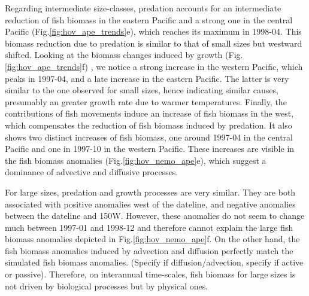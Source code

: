 Regarding intermediate size-classes, predation accounts for an intermediate reduction of fish biomass in the eastern Pacific and a strong one in the central Pacific (Fig.\ref{fig:hov_ape_trends}e), which reaches its maximum in 1998-04. This biomass reduction due to predation is similar to that of small sizes but westward shifted. Looking at the biomass  changes induced by growth (Fig.\ref{fig:hov_ape_trends}f) , we notice a strong increase in the western Pacific, which peaks in 1997-04, and a late increase  in the eastern Pacific. The latter is very similar to the one observed for small sizes, hence indicating similar causes, presumably an greater growth rate due to warmer temperatures. Finally, the contributions of fish movements induce an increase of fish biomass in the west, which compensates the reduction of fish biomass induced by predation. It also shows two distinct increases of fish biomass, one around 1997-04 in the central Pacific and one in 1997-10 in the western Pacific. These increases are visible in the fish biomass anomalies (Fig.\ref{fig:hov_nemo_ape}e), which suggest a dominance of advective and diffusive processes.

For large sizes, predation and growth processes are very similar. They are both associated with positive anomalies west of the dateline, and negative anomalies between the dateline and 150W. However, these anomalies do not seem to change much between 1997-01 and 1998-12 and therefore cannot explain the large fish biomass anomalies depicted in Fig.\ref{fig:hov_nemo_ape}f. On the other hand, the fish biomass anomalies induced by advection and diffusion perfectly match the simulated fish biomass anomalies. \warn(Specify if diffusion/advection, specify if active or passive). Therefore, on interannual time-scales, fish biomass for large sizes is not driven by biological processes but by physical ones.

